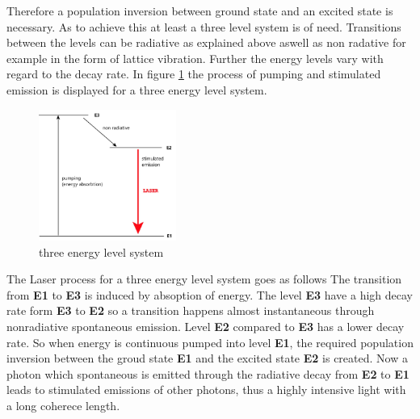 Therefore a population inversion
between ground state and an excited
state is necessary. As to achieve this at least
a three level system is of need.
Transitions between the levels can be radiative as explained above
aswell as non radative for example in the form of lattice vibration.
Further the energy levels vary with regard
to the decay rate. In figure \ref{fig:3_n} the process of pumping and stimulated emission
is displayed for a three energy level system.
\begin{figure}
  \centering
  \includegraphics[width=0.4\textwidth]{Laser_3_Niveau.jpg}
  \caption{three energy level system}
  \label{fig:3_n}
\end{figure}
The Laser process for a three energy level system
goes as follows
The transition from \textbf{E1} to \textbf{E3} is induced
by absoption of energy.
The level \textbf{E3} have a high
decay rate form \textbf{E3} to \textbf{E2}
so a transition happens almost instantaneous
through nonradiative spontaneous emission.
Level \textbf{E2} compared to \textbf{E3}
has a lower decay rate.
So when energy is continuous
pumped into level \textbf{E1},
the required population inversion
between the groud state \textbf{E1} and the
excited state \textbf{E2} is created.
Now a photon which spontaneous is emitted
through the radiative decay from
\textbf{E2} to \textbf{E1}
leads to
stimulated emissions of other photons,
thus a highly intensive
light with a long coherece length.

